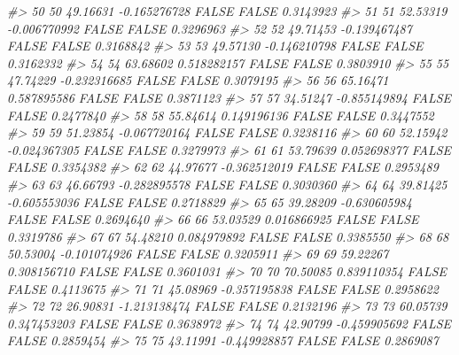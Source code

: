\documentclass[
  oneside]{book}
\newenvironment{Shaded}{\begin{snugshade}}{\end{snugshade}}
\newcommand{\CommentTok}[1]{\textcolor[rgb]{0.56,0.35,0.01}{\textit{#1}}}
\begin{document}
\begin{Shaded}
\begin{Highlighting}[]
\CommentTok{\#\textgreater{} 50   50  49.16631 {-}0.165276728     FALSE       FALSE        0.3143923}
\CommentTok{\#\textgreater{} 51   51  52.53319 {-}0.006770992     FALSE       FALSE        0.3296963}
\CommentTok{\#\textgreater{} 52   52  49.71453 {-}0.139467487     FALSE       FALSE        0.3168842}
\CommentTok{\#\textgreater{} 53   53  49.57130 {-}0.146210798     FALSE       FALSE        0.3162332}
\CommentTok{\#\textgreater{} 54   54  63.68602  0.518282157     FALSE       FALSE        0.3803910}
\CommentTok{\#\textgreater{} 55   55  47.74229 {-}0.232316685     FALSE       FALSE        0.3079195}
\CommentTok{\#\textgreater{} 56   56  65.16471  0.587895586     FALSE       FALSE        0.3871123}
\CommentTok{\#\textgreater{} 57   57  34.51247 {-}0.855149894     FALSE       FALSE        0.2477840}
\CommentTok{\#\textgreater{} 58   58  55.84614  0.149196136     FALSE       FALSE        0.3447552}
\CommentTok{\#\textgreater{} 59   59  51.23854 {-}0.067720164     FALSE       FALSE        0.3238116}
\CommentTok{\#\textgreater{} 60   60  52.15942 {-}0.024367305     FALSE       FALSE        0.3279973}
\CommentTok{\#\textgreater{} 61   61  53.79639  0.052698377     FALSE       FALSE        0.3354382}
\CommentTok{\#\textgreater{} 62   62  44.97677 {-}0.362512019     FALSE       FALSE        0.2953489}
\CommentTok{\#\textgreater{} 63   63  46.66793 {-}0.282895578     FALSE       FALSE        0.3030360}
\CommentTok{\#\textgreater{} 64   64  39.81425 {-}0.605553036     FALSE       FALSE        0.2718829}
\CommentTok{\#\textgreater{} 65   65  39.28209 {-}0.630605984     FALSE       FALSE        0.2694640}
\CommentTok{\#\textgreater{} 66   66  53.03529  0.016866925     FALSE       FALSE        0.3319786}
\CommentTok{\#\textgreater{} 67   67  54.48210  0.084979892     FALSE       FALSE        0.3385550}
\CommentTok{\#\textgreater{} 68   68  50.53004 {-}0.101074926     FALSE       FALSE        0.3205911}
\CommentTok{\#\textgreater{} 69   69  59.22267  0.308156710     FALSE       FALSE        0.3601031}
\CommentTok{\#\textgreater{} 70   70  70.50085  0.839110354     FALSE       FALSE        0.4113675}
\CommentTok{\#\textgreater{} 71   71  45.08969 {-}0.357195838     FALSE       FALSE        0.2958622}
\CommentTok{\#\textgreater{} 72   72  26.90831 {-}1.213138474     FALSE       FALSE        0.2132196}
\CommentTok{\#\textgreater{} 73   73  60.05739  0.347453203     FALSE       FALSE        0.3638972}
\CommentTok{\#\textgreater{} 74   74  42.90799 {-}0.459905692     FALSE       FALSE        0.2859454}
\CommentTok{\#\textgreater{} 75   75  43.11991 {-}0.449928857     FALSE       FALSE        0.2869087}

\end{Highlighting}
\end{Shaded}
\end{document}
